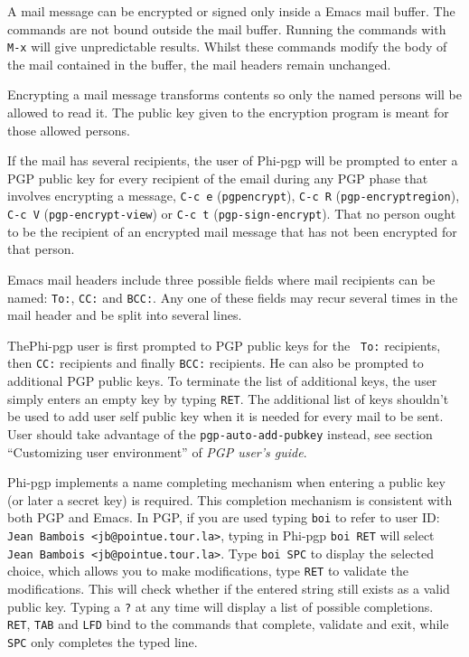A  mail message can  be encrypted or signed   only inside a Emacs mail
buffer.  The commands are not bound outside the  mail buffer.  Running
the commands  with {\tt M-x}  will  give unpredictable results. Whilst
these commands modify the  body of the  mail contained in the  buffer,
the mail headers remain unchanged.

Encrypting   a mail  message  transforms  contents so  only  the named
persons  will be  allowed to read  it. The  public  key  given to  the
encryption program is meant for those allowed persons.

If the mail has   several recipients,  the  user  of Phi-pgp  will  be
prompted  to enter a PGP  public key for every  recipient of the email
during any PGP phase  that involves encrypting a  message, {\tt C-c e}
({\tt pgp\-encrypt}), {\tt C-c R} ({\tt pgp-encrypt\-region}), {\tt C-c
V} ({\tt pgp-encrypt-view})  or {\tt C-c t} ({\tt  pgp-sign-encrypt}).
That no person ought to be the recipient of  an encrypted mail message
that has not been encrypted for that person.

Emacs mail headers include three possible fields where mail recipients
can be named: {\tt To:},  {\tt CC:} and {\tt BCC:}.   Any one of these
fields may recur several  times in the  mail header and be split  into
several lines.

 ThePhi-pgp user  is first prompted to PGP   public keys for  the {\tt
To:} recipients,  then  {\tt CC:} recipients  and  finally  {\tt BCC:}
recipients. He can also be prompted to additional  PGP public keys. To
terminate the list of additional keys, the user simply enters an empty
key by typing {\tt RET}. The additional list of keys shouldn't be used
to  add user self  public key when  it is needed  for every mail to be
sent. User should take   advantage  of the {\tt   pgp-auto-add-pubkey}
instead,  see section ``Customizing   user  environment'' of  {\it PGP
user's guide}.

Phi-pgp implements a name completing mechanism  when entering a public
key (or later a secret key) is required.  This completion mechanism is
consistent with both  PGP and Emacs.  In PGP,  if you are  used typing
{\tt   boi}      to  refer   to    user  ID:      {\tt   Jean  Bambois
<jb@pointue.tour.la>}, typing  in Phi-pgp  {\tt  boi~RET}  will select
{\tt  Jean  Bambois  <jb@pointue.tour.la>}.    Type {\tt  boi~SPC}  to
display the  selected choice, which allows  you to make modifications,
type {\tt RET} to validate the modifications.  This will check whether
if the  entered string still exists as  a valid public  key.  Typing a
{\tt ?} at any time will display a list of possible completions.  {\tt
RET}, {\tt  TAB}  and {\tt LFD}  bind  to the  commands that complete,
validate and exit, while {\tt SPC} only completes the typed line.

